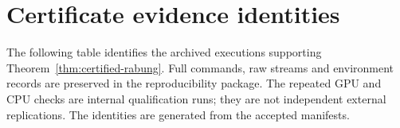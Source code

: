 \section{Certificate evidence identities}\label{s:certificate-evidence}

The following table identifies the archived executions supporting
Theorem~\ref{thm:certified-rabung}. Full commands, raw streams and environment
records are preserved in the reproducibility package. The repeated GPU and
CPU checks are internal qualification runs; they are not independent external
replications. The identities are generated from the accepted manifests.

